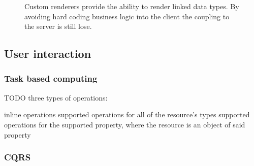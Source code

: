 \begin{figure}[!htb]
  \caption{\label{fig:my-label} Custom renderers provide the ability to render linked data types. By avoiding hard coding business logic into the client the coupling to the server is still lose.}
\end{figure}

\subsection{User interaction}\label{interaction}

\subsubsection{Task based computing}\label{interaction}
TODO three types of operations:

inline operations
supported operations for all of the resource's types
supported operations for the supported property, where the resource is an object of said property

\subsubsection{CQRS}\label{interaction}
